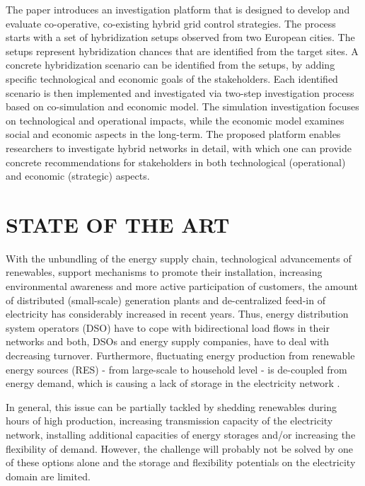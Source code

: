 \documentclass[review]{elsarticle}
\begin{document}
The paper introduces an investigation platform that is designed   
to develop and evaluate co-operative, co-existing hybrid grid control 
strategies. The process starts with a set of hybridization 
setups observed from two European cities. The setups represent
hybridization chances that are identified from the target sites. 
A concrete hybridization scenario can be identified from the setups,
by adding specific technological and economic goals of the
stakeholders. Each identified scenario is then implemented and
investigated via two-step investigation process based on
co-simulation and economic model. The simulation investigation 
focuses on technological and operational impacts, while the
economic model examines social and economic aspects in the
long-term. 
The proposed platform enables researchers to investigate hybrid
networks in detail, with which one can provide concrete
recommendations for stakeholders in both technological (operational)
and economic (strategic) aspects.  

\section{\uppercase{State of the art}}
\label{sec:soa}
With the unbundling of the energy supply chain, technological
advancements of renewables, support mechanisms to promote their
installation, increasing environmental awareness and more active
participation of customers, the amount of distributed (small-scale)
generation plants and de-centralized feed-in of electricity has
considerably increased in recent years. Thus, energy distribution
system operators (DSO) have to cope with bidirectional load flows in
their networks and both, DSOs and energy supply companies, have to
deal with decreasing turnover. Furthermore, fluctuating energy
production from renewable energy sources (RES) - from large-scale to
household level - is de-coupled from  energy demand, which is 
causing a lack of storage in the electricity network
\cite{trebolle_2010}. 

In general, this issue can be partially tackled by shedding
renewables during hours of high production, increasing
transmission capacity of the electricity network, installing
additional capacities of energy storages and/or increasing the
flexibility of demand.
However, the challenge will probably not be solved by one of these
options alone and the storage and flexibility potentials on the
electricity domain are limited. 
\end{document}
